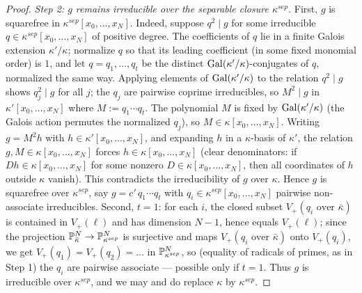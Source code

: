 \begin{proof}
    \emph{Step 2: $g$ remains irreducible over the separable closure $\kappa^{sep}$.}
    First, $g$ is squarefree in $\kappa^{sep}[x_0, \dots, x_N]$. Indeed, suppose $q^2 \mid g$
    for some irreducible $q \in \kappa^{sep}[x_0, \dots, x_N]$ of positive degree. The
    coefficients of $q$ lie in a finite Galois extension $\kappa'/\kappa$; normalize $q$ so
    that its leading coefficient (in some fixed monomial order) is $1$, and let
    $q = q_1, \dots, q_t$ be the distinct $\operatorname{Gal}(\kappa'/\kappa)$-conjugates of $q$, normalized
    the same way. Applying elements of $\operatorname{Gal}(\kappa'/\kappa)$ to the relation $q^2 \mid g$
    shows $q_j^2 \mid g$ for all $j$; the $q_j$ are pairwise coprime irreducibles, so
    $M^2 \mid g$ in $\kappa'[x_0, \dots, x_N]$ where $M := q_1 \cdots q_t$. The polynomial $M$
    is fixed by $\operatorname{Gal}(\kappa'/\kappa)$ (the Galois action permutes the normalized $q_j$), so
    $M \in \kappa[x_0, \dots, x_N]$. Writing $g = M^2 h$ with
    $h \in \kappa'[x_0, \dots, x_N]$, and expanding $h$ in a $\kappa$-basis of $\kappa'$, the
    relation $g, M \in \kappa[x_0, \dots, x_N]$ forces $h \in \kappa[x_0, \dots, x_N]$
    (clear denominators: if $D h \in \kappa[x_0,\dots,x_N]$ for some nonzero
    $D \in \kappa[x_0,\dots,x_N]$, then all coordinates of $h$ outside $\kappa$ vanish). This
    contradicts the irreducibility of $g$ over $\kappa$. Hence $g$ is squarefree over
    $\kappa^{sep}$, say $g = c' \, q_1 \cdots q_t$ with $q_i \in \kappa^{sep}[x_0, \dots, x_N]$
    pairwise non-associate irreducibles.
    Second, $t = 1$: for each $i$, the closed subset $V_+(q_i \text{ over } \bar{\kappa})$ is
    contained in $V_+(\ell)$ and has dimension $N - 1$, hence equals $V_+(\ell)$; since the
    projection $\mathbb{P}^N_{\bar\kappa} \to \mathbb{P}^N_{\kappa^{sep}}$ is surjective and maps
    $V_+(q_i \text{ over } \bar\kappa)$ onto $V_+(q_i)$, we get
    $V_+(q_1) = V_+(q_2) = \dots$ in $\mathbb{P}^N_{\kappa^{sep}}$, so (equality of radicals of
    primes, as in Step 1) the $q_i$ are pairwise associate --- possible only if $t = 1$.
    Thus $g$ is irreducible over $\kappa^{sep}$, and we may and do replace $\kappa$ by
    $\kappa^{sep}$.


\end{proof}

